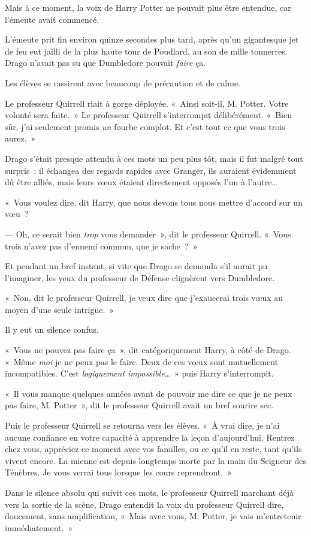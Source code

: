 Mais à ce moment, la voix de Harry Potter ne pouvait plus être entendue, car l'émeute avait commencé.

\later

L'émeute prit fin environ quinze secondes plus tard, après qu'un gigantesque jet de feu eut jailli de la plus haute tour de Poudlard, au son de mille tonnerres.
Drago n'avait pas su que Dumbledore pouvait \emph{faire} ça.

Les élèves se rassirent avec beaucoup de précaution et de calme.

Le professeur Quirrell riait à gorge déployée.
«~Ainsi soit-il, M. Potter.
Votre volonté sera faite.~»
Le professeur Quirrell s'interrompit délibérément.
«~Bien sûr, j'ai seulement promis \emph{un} fourbe complot.
Et c'est tout ce que vous trois aurez.~»

Drago s'était presque attendu à ces mots un peu plus tôt, mais il fut malgré tout surpris~; il échangea des regards rapides avec Granger, ils auraient évidemment dû être alliés, mais leurs vœux étaient directement opposés l'un à l'autre…

«~Vous voulez dire, dit Harry, que nous devons tous nous mettre d'accord sur un vœu~?

--- Oh, ce serait bien \emph{trop} vous demander~», dit le professeur Quirrell.
«~Vous trois n'avez pas d'ennemi commun, que je sache~?~»

Et pendant un bref instant, si vite que Drago se demanda s'il aurait pu l'imaginer, les yeux du professeur de Défense clignèrent vers Dumbledore.

«~Non, dit le professeur Quirrell, je veux dire que j'exaucerai trois vœux au moyen d'une seule intrigue.~»

Il y eut un silence confus.

«~Vous ne pouvez pas faire ça~», dit catégoriquement Harry, à côté de Drago.
«~Même \emph{moi} je ne peux pas le faire.
Deux de ces vœux sont mutuellement incompatibles.
C'est \emph{logiquement impossible}…~»
puis Harry s'interrompit.

«~Il vous manque quelques années avant de pouvoir me dire ce que je ne peux pas faire, M. Potter~», dit le professeur Quirrell avait un bref sourire sec.

Puis le professeur Quirrell se retourna vers les élèves.
«~À vrai dire, je n'ai aucune confiance en votre capacité à apprendre la leçon d'aujourd'hui.
Rentrez chez vous, appréciez ce moment avec vos familles, ou ce qu'il en reste, tant qu'ils vivent encore.
La mienne est depuis longtemps morte par la main du Seigneur des Ténèbres.
Je vous verrai tous lorsque les cours reprendront.~»

Dans le silence absolu qui suivit ces mots, le professeur Quirrell marchant déjà vers la sortie de la scène, Drago entendit la voix du professeur Quirrell dire, doucement, sans amplification, «~Mais avec vous, M. Potter, je vais m'entretenir immédiatement.~»
